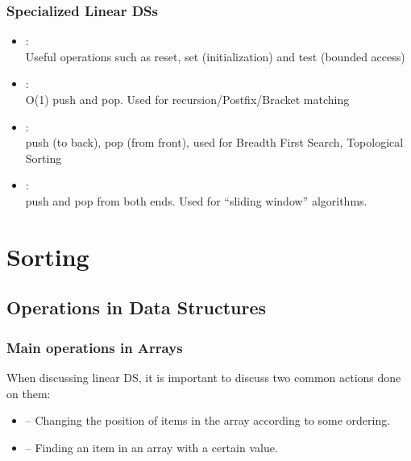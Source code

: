 \documentclass{beamer}
\begin{document}
\begin{frame}
  \frametitle{Specialized Linear DSs}
  \begin{itemize}
  \item {}:\\
    Useful operations such as reset, set (initialization) and test (bounded access)
  \item {}:\\
    O(1) push and pop. Used for recursion/Postfix/Bracket matching
  \item {}:\\
    push (to back), pop (from front), used for Breadth First Search, Topological Sorting
  \item {}:\\
    push and pop from both ends. Used for ``sliding window'' algorithms.
  \end{itemize}
\end{frame}


\section{Sorting}
\subsection{Operations in Data Structures}

\begin{frame}
  \frametitle{Main operations in Arrays}

  When discussing linear DS, it is important to discuss two common
  actions done on them:

  \bigskip

  \begin{itemize}
    \item {} -- Changing the position of items in the
      array according to some ordering.

      \bigskip

    \item {} -- Finding an item in an array with a
      certain value.
  \end{itemize}
\end{frame}
\end{document}
